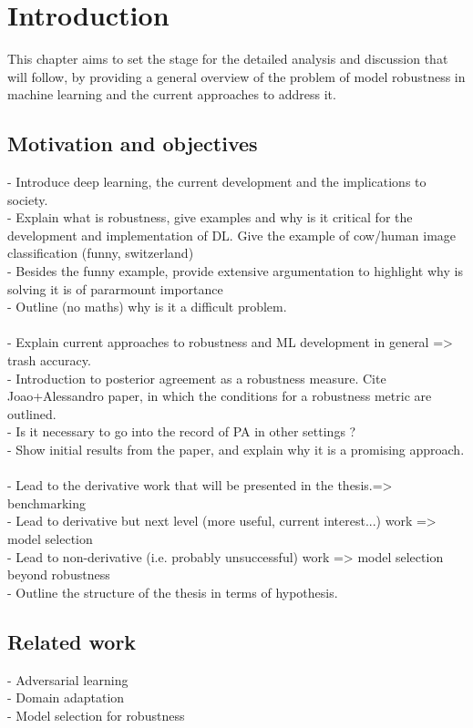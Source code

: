 \chapter{Introduction}\label{sec:introduction}

This chapter aims to set the stage for the detailed analysis and discussion that will follow, by 
providing a general overview of the problem of model robustness in machine learning and the current
approaches to address it.

\section{Motivation and objectives}\label{sec:motivation}

- Introduce deep learning, the current development and the implications to society. \\
- Explain what is robustness, give examples and why is it critical for the development and implementation of DL.
Give the example of cow/human image classification (funny, switzerland)\\
- Besides the funny example, provide extensive argumentation to highlight why is solving it is of pararmount importance \\
- Outline (no maths) why is it a difficult problem. \\
\\
- Explain current approaches to robustness and ML development in general => trash accuracy. \\
- Introduction to posterior agreement as a robustness measure. Cite Joao+Alessandro paper, in which
the conditions for a robustness metric are outlined.  \\
- Is it necessary to go into the record of PA in other settings ? \\
- Show initial results from the paper, and explain why it is a promising approach.  \\
\\
- Lead to the derivative work that will be presented in the thesis.=> benchmarking \\
- Lead to derivative but next level (more useful, current interest...) work => model selection \\
- Lead to non-derivative (i.e. probably unsuccessful) work => model selection beyond robustness \\
- Outline the structure of the thesis in terms of hypothesis. \\


\section{Related work}\label{sec:structure}

- Adversarial learning \\
- Domain adaptation \\
- Model selection for robustness \\